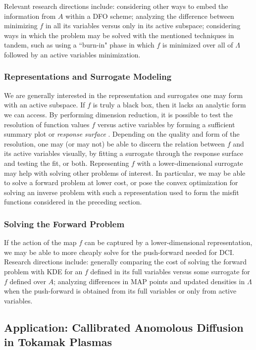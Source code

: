 \documentclass{amsart}
\begin{document}
Relevant research directions include: considering other ways to embed the information from $A$ within a DFO scheme; analyzing the difference between minimizing $f$ in all its variables versus only in its active subspace; considering ways in which the problem may be solved with the mentioned techniques in tandem, such as using a ``burn-in" phase in which $f$ is minimized over all of $\Lambda$ followed by an active variables minimization.


\subsubsection{Representations and Surrogate Modeling} We are generally interested in the representation and surrogates one may form with an active subspace. If $f$ is truly a black box, then it lacks an analytic form we can access. By performing dimension reduction, it is possible to test the resolution of function values $f$ versus active variables by forming a sufficient summary plot or \emph{response surface} \cite{Constantine2015}. Depending on the quality and form of the resolution, one may (or may not) be able to discern the relation between $f$ and its active variables visually, by fitting a surrogate through the response surface and testing the fit, or both. Representing $f$ with a lower-dimensional surrogate may help with solving other problems of interest. In particular, we may be able to solve a forward problem at lower cost, or pose the convex optimization for solving an inverse problem with such a representation used to form the misfit functions considered in the preceding section.


\subsubsection{Solving the Forward Problem} If the action of the map $f$ can be captured by a lower-dimensional representation, we may be able to more cheaply solve for the push-forward needed for DCI. Research directions include: generally comparing the cost of solving the forward problem with KDE for an $f$ defined in its full variables versus some surrogate for $f$ defined over $A$; analyzing differences in MAP points and updated densities in $\Lambda$ when the push-forward is obtained from its full variables or only from active variables.


\subsection{Application: Callibrated Anomolous Diffusion in Tokamak Plasmas}
\end{document}

